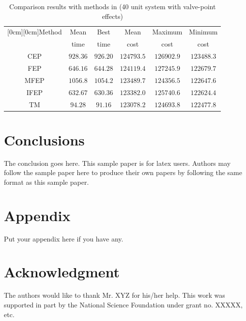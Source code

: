 \documentclass[conference]{IEEEtran}
\begin{document}
\begin{table}[h]
\caption{Comparison results  with methods in \cite{cit:mic77} 
(40 unit system with valve-point effects)}
\begin{center}
\begin{tabular}{|c|c|c|c|c|c|}
\hline
\multicolumn{1}{|c|}{\raisebox{-1.50ex}[0cm][0cm]{\!Method\!}}
& \multicolumn{1}{|c|}{Mean}%
& \multicolumn{1}{|c|}{Best}%
& \multicolumn{1}{|c|}{Mean}%
& \multicolumn{1}{|c|}{Maximum}%
& \multicolumn{1}{|c|}{Minimum} \\%
& time&time& cost&cost&cost\\ \hline
 CEP   &  $928.36$  &  $926.20$  &  $124793.5$ & $126902.9$ & $123488.3$ \\ \hline
 FEP   &  $646.16$  &  $644.28$  &  $124119.4$ & $127245.9$ & $122679.7$ \\ \hline
 MFEP  &  $1056.8$  &  $1054.2$  &  $123489.7$ & $124356.5$ & $122647.6$ \\ \hline
 IFEP  &  $632.67$  &  $630.36$  &  $123382.0$ & $125740.6$ & $122624.4$ \\ \hline
 TM    &  $94.28$  &  $91.16$  &  $123078.2$ & $124693.8$ & $122477.8$ \\ \hline
\end{tabular}
\label{tab-liu2}
\end{center}
\end{table}

\section{Conclusions}
The conclusion goes here.
This sample paper is for latex users. Authors may follow the sample paper here to 
produce their own 
papers by following the same format as this sample paper.


\section*{Appendix}
Put your appendix here if you have any.

\section*{Acknowledgment}
The authors would like to thank Mr. XYZ for his/her help.
This work was supported in part by the National Science Foundation
under grant no. XXXXX, etc.
\end{document}
